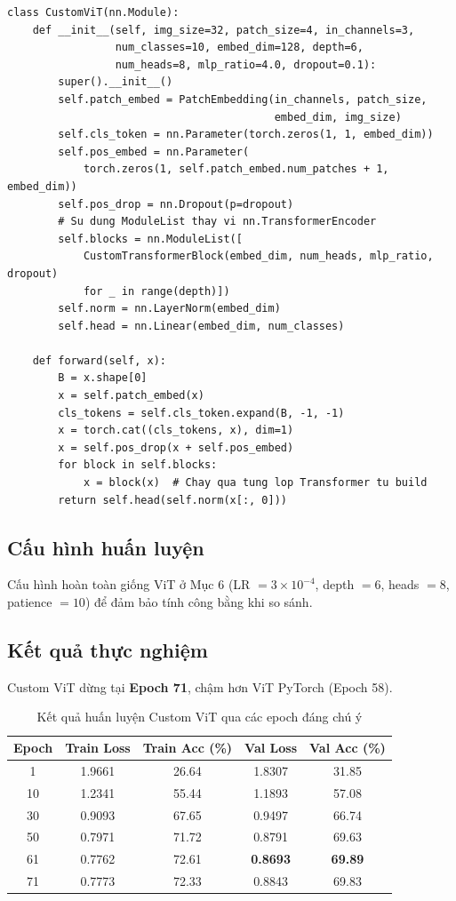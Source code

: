 \documentclass[a4paper]{article}
\theoremstyle{definition}
\begin{document}
\begin{verbatim}
class CustomViT(nn.Module):
    def __init__(self, img_size=32, patch_size=4, in_channels=3,
                 num_classes=10, embed_dim=128, depth=6,
                 num_heads=8, mlp_ratio=4.0, dropout=0.1):
        super().__init__()
        self.patch_embed = PatchEmbedding(in_channels, patch_size,
                                          embed_dim, img_size)
        self.cls_token = nn.Parameter(torch.zeros(1, 1, embed_dim))
        self.pos_embed = nn.Parameter(
            torch.zeros(1, self.patch_embed.num_patches + 1, embed_dim))
        self.pos_drop = nn.Dropout(p=dropout)
        # Su dung ModuleList thay vi nn.TransformerEncoder
        self.blocks = nn.ModuleList([
            CustomTransformerBlock(embed_dim, num_heads, mlp_ratio, dropout)
            for _ in range(depth)])
        self.norm = nn.LayerNorm(embed_dim)
        self.head = nn.Linear(embed_dim, num_classes)

    def forward(self, x):
        B = x.shape[0]
        x = self.patch_embed(x)
        cls_tokens = self.cls_token.expand(B, -1, -1)
        x = torch.cat((cls_tokens, x), dim=1)
        x = self.pos_drop(x + self.pos_embed)
        for block in self.blocks:
            x = block(x)  # Chay qua tung lop Transformer tu build
        return self.head(self.norm(x[:, 0]))
\end{verbatim}

\subsection{Cấu hình huấn luyện}
Cấu hình hoàn toàn giống ViT ở Mục 6 (LR $= 3 \times 10^{-4}$, depth $= 6$, heads $= 8$, patience $= 10$) để đảm bảo tính công bằng khi so sánh.

\subsection{Kết quả thực nghiệm}

Custom ViT dừng tại \textbf{Epoch 71}, chậm hơn ViT PyTorch (Epoch 58).

\begin{table}[H]
	\centering
	\caption{Kết quả huấn luyện Custom ViT qua các epoch đáng chú ý}
	\footnotesize
	\begin{tabular}{|c|c|c|c|c|}
		\hline
		\textbf{Epoch} & \textbf{Train Loss} & \textbf{Train Acc (\%)} & \textbf{Val Loss} & \textbf{Val Acc (\%)} \\ \hline
		1   & 1.9661 & 26.64 & 1.8307 & 31.85 \\ \hline
		10  & 1.2341 & 55.44 & 1.1893 & 57.08 \\ \hline
		30  & 0.9093 & 67.65 & 0.9497 & 66.74 \\ \hline
		50  & 0.7971 & 71.72 & 0.8791 & 69.63 \\ \hline
		61  & 0.7762 & 72.61 & \textbf{0.8693} & \textbf{69.89} \\ \hline
		71  & 0.7773 & 72.33 & 0.8843 & 69.83 \\ \hline
	\end{tabular}
	\label{tab:custom-vit-results}
\end{table}
\end{document}
